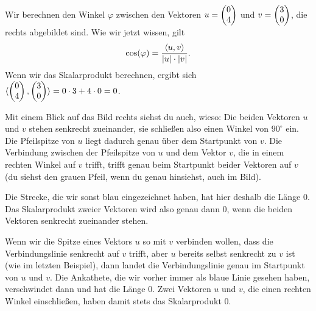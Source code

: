 \documentclass[../../main.tex]{subfiles}
\begin{document}
\begin{example}{}
    Wir berechnen den Winkel $\varphi$ zwischen den Vektoren $u=\begin{pmatrix} 0\\ 4 \end{pmatrix}$ und $v=\begin{pmatrix} 3\\ 0 \end{pmatrix}$, die rechts abgebildet sind.
    Wie wir jetzt wissen, gilt
    \[\cos(\varphi)=\frac{\langle u, v \rangle}{\lvert u\rvert\cdot\lvert v\rvert}.\]
    Wenn wir das Skalarprodukt berechnen, ergibt sich $\langle \begin{pmatrix} 0\\ 4 \end{pmatrix}, \begin{pmatrix} 3\\ 0 \end{pmatrix} \rangle=0\cdot 3+4\cdot 0=0$.
    
    Mit einem Blick auf das Bild rechts siehst du auch, wieso: Die beiden Vektoren $u$ und $v$ stehen senkrecht zueinander,
    sie schließen also einen Winkel von $90^\circ$ ein. Die Pfeilspitze von $u$ liegt dadurch genau über dem Startpunkt
    von $v$. Die Verbindung zwischen der Pfeilspitze von $u$ und dem Vektor $v$, die in einem rechten Winkel auf $v$ trifft,
    trifft genau beim Startpunkt beider Vektoren auf $v$ (du siehst den grauen Pfeil, wenn du genau hinsiehst, auch im Bild). 
    
    Die Strecke, die wir sonst blau eingezeichnet haben,
    hat hier deshalb die Länge 0. Das Skalarprodukt zweier Vektoren wird also genau dann 0, wenn die beiden Vektoren
    senkrecht zueinander stehen.
\end{example}
Wenn wir die Spitze eines Vektors $u$ so mit $v$ verbinden wollen, dass die Verbindungslinie senkrecht auf $v$ trifft,
aber $u$ bereits selbst senkrecht zu $v$ ist (wie im letzten Beispiel), dann landet die Verbindungslinie genau im Startpunkt von $u$ und $v$. Die
Ankathete, die wir vorher immer als blaue Linie gesehen haben, verschwindet dann und hat die Länge 0. Zwei Vektoren $u$
und $v$, die einen rechten Winkel einschließen, haben damit stets das Skalarprodukt 0.
\end{document}
